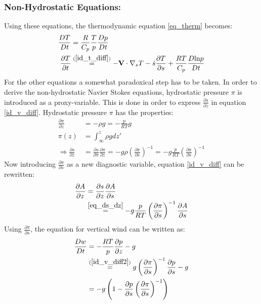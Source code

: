 \subsubsection{Non-Hydrostatic Equations:}\label{sec:non_hydrostatic}
Using these equations, the thermodynamic equation \ref{eq_therm} becomes:
\begin{align*}
\frac{DT}{Dt} &= \frac{R}{C_p}\frac{T}{p}\frac{Dp}{Dt}\\
\frac{\partial T}{\partial t} &\stackrel{(\ref{id_t_diff})}{=} -\textbf{V} \cdot \nabla _s T - \dot{s} \frac{\partial T}{\partial s}+\frac{RT}{C_p}\frac{D\text{ln}p}{Dt}
\end{align*}
For the other equations a somewhat paradoxical step has to be taken.
In order to derive the non-hydrostatic Navier Stokes equations, hydrostatic pressure $\pi$ is introduced as a proxy-variable.
This is done in order to express $\frac{\partial s}{\partial z}$ in equation \ref{id_v_diff}.
Hydrostatic pressure $\pi$ has the properties:
\begin{align}
\frac{\partial \pi}{\partial z} &= -\rho g = - \frac{p}{RT}g \nonumber \\
\pi(z) &= \int_\infty ^z \rho g dz' \nonumber \\
\Rightarrow \frac{\partial s}{\partial z} &= \frac{\partial s}{\partial \pi}\frac{\partial \pi}{\partial z} = - g\rho\left(\frac{\partial \pi}{\partial s}\right)^{-1} = - g\frac{p}{RT}\left(\frac{\partial \pi}{\partial s}\right)^{-1} \label{eq_ds_dz}
\end{align}
Now introducing $\frac{\partial \pi}{\partial s}$ as a new diagnostic variable, equation \ref{id_v_diff} can be rewritten:
\begin{align}
\frac{\partial A}{\partial z} &= \frac{\partial s}{\partial z} \frac{\partial A}{\partial s}\nonumber\\
&\stackrel{\ref{eq_ds_dz}}{=} - g\frac{p}{RT}\left(\frac{\partial \pi}{\partial s}\right)^{-1}\frac{\partial A}{\partial s}\label{id_v_diff2}
\end{align}
Using $\frac{\partial \pi}{\partial s}$, the equation for vertical wind can be written as:
\begin{align*}
\frac{Dw}{Dt} &= - \frac{RT}{p} \frac{\partial p}{\partial z} - g\\
&\stackrel{(\ref{id_v_diff2})}{=} g \left(\frac{\partial \pi}{\partial s}\right)^{-1}\frac{\partial p}{\partial s} - g\\
&= -g\left(1 - \frac{\partial p}{\partial s}\left(\frac{\partial \pi}{\partial s}\right)^{-1}\right)
\end{align*}
